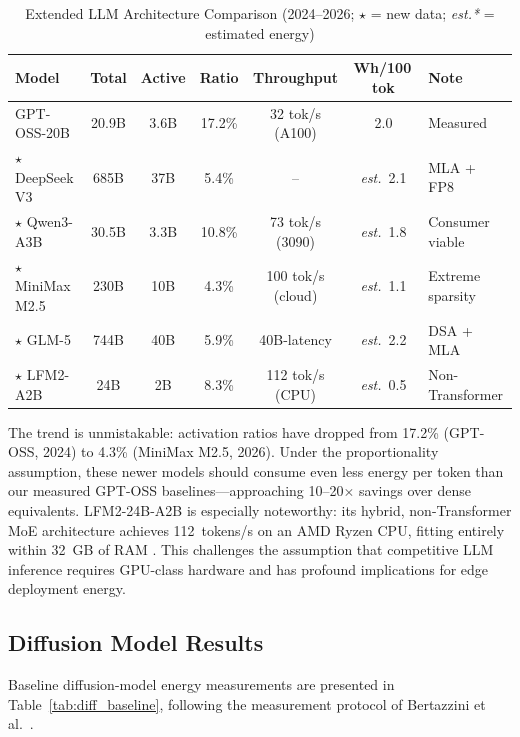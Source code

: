 \documentclass[AMS,STIX2COL]{WileyNJD-v2}
\begin{document}
\begin{table}[t]
\caption{Extended LLM Architecture Comparison (2024--2026; $\star$ = new data; \textit{est.*} = estimated energy)}\label{tab:llm_extended}
\centering
\begin{tabular}{lcccccl}
\toprule
\textbf{Model} & \textbf{Total} & \textbf{Active} & \textbf{Ratio} & \textbf{Throughput} & \textbf{Wh/100\,tok} & \textbf{Note} \\
\midrule
GPT-OSS-20B        & 20.9B  & 3.6B  & 17.2\%  & 32 tok/s (A100)        & 2.0       & Measured \\
$\star$ DeepSeek V3 & 685B   & 37B   & 5.4\%   & --                     & \textit{est.}~2.1  & MLA + FP8 \\
$\star$ Qwen3-A3B   & 30.5B  & 3.3B  & 10.8\%  & 73 tok/s (3090)        & \textit{est.}~1.8  & Consumer viable \\
$\star$ MiniMax M2.5 & 230B  & 10B   & 4.3\%   & 100 tok/s (cloud)      & \textit{est.}~1.1  & Extreme sparsity \\
$\star$ GLM-5       & 744B   & 40B   & 5.9\%   & 40B-latency            & \textit{est.}~2.2  & DSA + MLA \\
$\star$ LFM2-A2B    & 24B    & 2B    & 8.3\%   & 112 tok/s (CPU)        & \textit{est.}~0.5  & Non-Transformer \\
\bottomrule
\end{tabular}
\end{table}

The trend is unmistakable: activation ratios have dropped from 17.2\% (GPT-OSS, 2024) to 4.3\% (MiniMax M2.5, 2026). Under the proportionality assumption, these newer models should consume even less energy per token than our measured GPT-OSS baselines---approaching 10--20$\times$ savings over dense equivalents. LFM2-24B-A2B is especially noteworthy: its hybrid, non-Transformer MoE architecture achieves 112~tokens/s on an AMD Ryzen CPU, fitting entirely within 32~GB of RAM \cite{liquid2025lfm2}. This challenges the assumption that competitive LLM inference requires GPU-class hardware and has profound implications for edge deployment energy.

\subsection{Diffusion Model Results}

Baseline diffusion-model energy measurements are presented in Table~\ref{tab:diff_baseline}, following the measurement protocol of Bertazzini et al.\ \cite{bertazzini2025hidden}.
\end{document}
